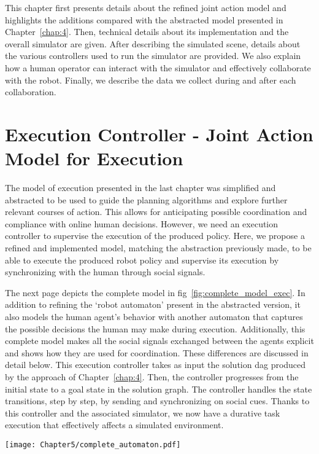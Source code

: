 This chapter first presents details about the refined joint action model and highlights the additions compared with the abstracted model presented in Chapter~\ref{chap:4}. Then, technical details about its implementation and the overall simulator are given. After describing the simulated scene, details about the various controllers used to run the simulator are provided. We also explain how a human operator can interact with the simulator and effectively collaborate with the robot. Finally, we describe the data we collect during and after each collaboration. 


\section{Execution Controller - Joint Action Model for Execution}

The model of execution presented in the last chapter was simplified and abstracted to be used to guide the planning algorithms and explore further relevant courses of action. This allows for anticipating possible coordination and compliance with online human decisions. 
However, we need an execution controller to supervise the execution of the produced policy. Here, we propose a refined and implemented model, matching the abstraction previously made, to be able to execute the produced robot policy and supervise its execution by synchronizing with the human through social signals.

The next page depicts the complete model in fig~\ref{fig:complete_model_exec}. In addition to refining the `robot automaton' present in the abstracted version, it also models the human agent's behavior with another automaton that captures the possible decisions the human may make during execution. Additionally, this complete model makes all the social signals exchanged between the agents explicit and shows how they are used for coordination. These differences are discussed in detail below. This execution controller takes as input the solution \acrshort{dag} produced by the approach of Chapter~\ref{chap:4}. Then, the controller progresses from the initial state to a goal state in the solution graph. The controller handles the state transitions, step by step, by sending and synchronizing on social cues. Thanks to this controller and the associated simulator, we now have a durative task execution that effectively affects a simulated environment.

\begin{sidewaysfigure}
    \centering
    \texttt{[image: Chapter5/complete\_automaton.pdf]}
    \caption{Complete Model of Concurrent and Compliant Joint Action used as an execution scheme. This version details the robot automaton and the assumed human automaton as well as the visual signals exchanges between the agents to synchronize themselves.}
    \label{fig:complete_model_exec}
\end{sidewaysfigure}


